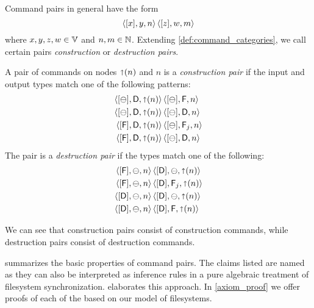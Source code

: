 \myskip
Command pairs in general have the form
\[ \cxynv\cc  \czwmv \]
where $x,y,z,w\in\setv$ and $n,m\in\setn$. 
Extending \cref{def:command_categories}, we call certain pairs
\emph{construction} or \emph{destruction pairs}.

\begin{mydef}
A pair of commands on nodes $\pn$ and $n$
is a \emph{construction pair} if the input and output types match
one of the following patterns:
   \begin{align*}
            \cbda{\pn}&\cc  \cbfa{n} \\
            \cbda{\pn}&\cc  \cbda{n} \\
            \cfda{\pn}&\cc  \caaa{\empt}{\valff}{n} \\
            \cfda{\pn}&\cc  \cbda{n}
   \end{align*}
The pair is a \emph{destruction pair} if the types match one of the following:
   \begin{align*}
            \cfba{n}&\cc  \cdba{\pn} \\
            \cfba{n}&\cc  \caaa{\vald}{\valff}{\pn} \\
            \cdba{n}&\cc  \cdba{\pn} \\
            \cdba{n}&\cc  \cdfa{\pn}
   \end{align*}
\end{mydef}

We can see that construction pairs consist of construction commands,
while destruction pairs consist of destruction commands.




 summarizes the basic properties of command pairs.
The claims listed are named \emph{}
as they can also be interpreted as inference rules in a pure
algebraic treatment of filesystem synchronization.
 elaborates this approach.
In \cref{axiom_proof} we offer proofs of each of the
\emph{} based on our model of filesystems.

